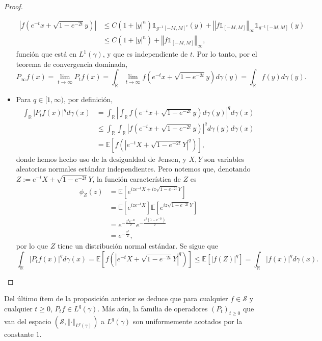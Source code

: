\documentclass[letterpaper,twoside,12pt]{book}
\newcommand{\R}{\mathbb{R}}
\renewcommand{\S}{\mathcal{S}}
\newcommand{\E}{\mathbb{E}}
\newcommand{\1}{\mathds{1}}
\newcommand{\abs}[1]{\left\lvert #1 \right\rvert}
\renewcommand{\to}{\rightarrow}
\newcommand{\norm}[1]{\left\Vert #1 \right\Vert}
\theoremstyle{definition}
\theoremstyle{definition}
\theoremstyle{remark}
\theoremstyle{definition}
\theoremstyle{definition}
\theoremstyle{definition}
\theoremstyle{definition}
\theoremstyle{definition}
\begin{document}
\begin{proof}
\begin{itemize}
    \begin{align*}
       \abs{f\left(e^{-t}x+\sqrt{1-e^{-2t}}y\right)}&\leq C(1+|y|^n)\1_{g^{-1}[-M,M]^{c}}(y)+\norm{f\1_{[-M,M]}}_\infty\1_{g^{-1}[-M,M]}(y)\\
       &\leq C(1+|y|^n)+\norm{f\1_{[-M,M]}}_\infty,
    \end{align*}
    función que está en $L^1(\gamma)$, y que es independiente de $t$. Por lo tanto, por el teorema de convergencia dominada, 
    \[
    P_\infty f(x)=\lim_{t\to\infty}P_tf(x)=\int_\R\lim_{t\to\infty}f\left(e^{-t}x+\sqrt{1-e^{-2t}}y\right)d\gamma(y)=\int_\R f(y)d\gamma(y).
    \]
    \item Para $q\in [1,\infty)$, por definición,
    \begin{align*}
       \int_\R |P_tf(x)|^q d\gamma(x)&=\int_\R \abs{\int_\R f\left(e^{-t}x+\sqrt{1-e^{-2t}}y\right)d\gamma(y)}^qd\gamma(x)\\
       &\leq \int_\R \int_\R \abs{f\left(e^{-t}x+\sqrt{1-e^{-2t}}y\right)}^qd\gamma(y)d\gamma(x)\\
       &=\E\left[f\left(\abs{e^{-t}X+\sqrt{1-e^{-2t}}Y}^q \right)\right],
    \end{align*}
    donde hemos hecho uso de la desigualdad de Jensen, y $X,Y$ son variables aleatorias normales estándar independientes. Pero notemos que, denotando $Z:= e^{-t}X+\sqrt{1-e^{-2t}}Y$, la función característica de $Z$ es
    \begin{align*}
      \phi_Z(z)&=\E\left[e^{ize^{-t}X+iz\sqrt{1-e^{-2t}}Y}\right]\\
      &=\E\left[e^{ize^{-t}X}\right]\E\left[e^{iz\sqrt{1-e^{-2t}}Y}\right]\\
      &=e^{-\frac{z^2e^{-2t}}{2}}e^{-\frac{z^2(1-e^{-2t})}{2}}\\
      &=e^{-\frac{z^2}{2}},
    \end{align*}  
    por lo que $Z$ tiene un distribución normal estándar. Se sigue que 
    \[
       \int_\R |P_tf(x)|^q d\gamma(x)=\E\left[f\left(\abs{e^{-t}X+\sqrt{1-e^{-2t}}Y}^q\right)\right]\leq\E\left[\abs{f(Z)}^q\right]=\int_\R \abs{f(x)}^qd\gamma(x).
    \]
  \end{itemize}
\end{proof}
Del último ítem de la proposición anterior se deduce que para cualquier $f\in \S$ y cualquier $t\geq0$, $P_tf\in L^q(\gamma)$. Más aún, la familia de operadores $(P_t)_{t\geq0}$ que van del espacio $(\S,\norm{\cdot}_{L^q(\gamma)})$ a $L^q(\gamma)$ son uniformemente acotados por la constante $1$.
\end{document}
